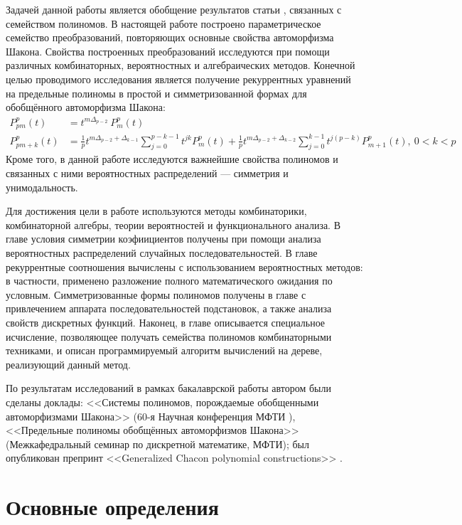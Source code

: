 \documentclass[14pt, a4paper, russian]{report}
\begin{document}
Задачей данной работы является обобщение результатов статьи \cite{weaklimits}, связанных с семейством полиномов. В настоящей работе построено параметрическое семейство преобразований, повторяющих основные свойства автоморфизма Шакона. Свойства построенных преобразований исследуются при помощи различных комбинаторных, вероятностных и алгебраических методов. Конечной целью проводимого исследования является получение рекуррентных уравнений на предельные полиномы в простой и симметризованной формах для обобщённого автоморфизма Шакона:
\begin{align*}
P_{pm}^p(t) & =  t^{m\Delta_{p-2}}\ P_m^p(t) \\
P_{pm+k}^p(t) & =  \frac{1}{p} t^{m\Delta_{p-2} + \Delta_{k-1}}\sum\limits_{j=0}^{p-k-1} t^{jk} P_m^p(t)  + \frac{1}{p} t^{m\Delta_{p-2} + \Delta_{k-2}}\sum\limits_{j=0}^{k-1} t^{j(p-k)} P_{m+1}^p(t), \ 0 < k < p
\end{align*}
 Кроме того, в данной работе исследуются важнейшие свойства полиномов и связанных с ними вероятностных распределений --- симметрия и унимодальность.

Для достижения цели в работе используются методы комбинаторики, комбинаторной алгебры, теории вероятностей и функционального анализа. В главе условия симметрии коэфиициентов получены при помощи анализа вероятностных распределений случайных последовательностей. В главе рекуррентные соотношения вычислены с использованием вероятностных методов: в частности, применено разложение полного математического ожидания по условным. Симметризованные формы полиномов получены в главе с привлечением аппарата последовательностей подстановок, а также анализа свойств дискретных функций. Наконец, в главе описывается специальное исчисление, позволяющее получать семейства полиномов комбинаторными техниками, и описан программируемый алгоритм вычислений на дереве, реализующий данный метод.

По результатам исследований в рамках бакалаврской работы автором были сделаны доклады: <<Системы полиномов, порождаемые обобщенными автоморфизмами Шакона>> (60-я Научная конференция МФТИ \cite{mipt60}), <<Предельные полиномы обобщённых автоморфизмов Шакона>> (Межкафедральный семинар по дискретной математике, МФТИ); был опубликован препринт <<Generalized Chacon polynomial constructions>> \cite{arxiv_preprint}.

\chapter{Основные определения}
\end{document}
